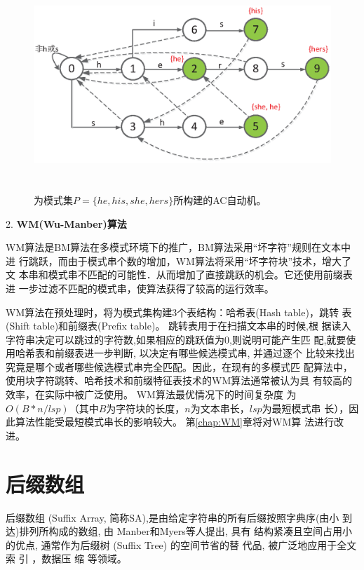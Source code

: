 \begin{figure}[H]
  \centering
  \includegraphics[height=8cm ,width=12cm]{figures/1_Introduction/AC.eps}
  \caption{为模式集$P=\{he, his, she, hers\}$所构建的AC自动机。}
  \label{fig:AC}
\end{figure}

2. \textbf{WM(Wu-Manber)算法}

WM算法是BM算法在多模式环境下的推广，BM算法采用“坏字符”规则在文本中进
行跳跃，而由于模式串个数的增加，WM算法将采用“坏字符块”技术，增大了文
本串和模式串不匹配的可能性．从而增加了直接跳跃的机会。它还使用前缀表进
一步过滤不匹配的模式串，使算法获得了较高的运行效率。

WM算法在预处理时，将为模式集构建3个表结构：哈希表(Hash table)，跳转
表(Shift table)和前缀表(Prefix table)。 跳转表用于在扫描文本串的时候,根
据读入字符串决定可以跳过的字符数,如果相应的跳跃值为0,则说明可能产生匹
配,就要使用哈希表和前缀表进一步判断, 以决定有哪些候选模式串, 并通过逐个
比较来找出究竟是哪个或者哪些候选模式串完全匹配。因此，在现有的多模式匹
配算法中，使用块字符跳转、哈希技术和前缀特征表技术的WM算法通常被认为具
有较高的效率，在实际中被广泛使用。 WM算法最优情况下的时间复杂度
为$O(B*n/lsp)$（其中$B$为字符块的长度，$n$为文本串长，$lsp$为最短模式串
长），因此算法性能受最短模式串长的影响较大。 第\ref{chap:WM}章将对WM算
法进行改进。

\section{后缀数组}

后缀数组 (Suffix Array, 简称SA),是由给定字符串的所有后缀按照字典序(由小
到达)排列所构成的数组, 由 Manber和Myers等人提出\cite{Manber1993}, 具有
结构紧凑且空间占用小的优点, 通常作为后缀树 (Suffix Tree) 的空间节省的替
代品, 被广泛地应用于全文索
引 \cite{Strate2015,Fischer2017,Arroyuelo2014}，数据压
缩\cite{Louza2015,Chien2015,Pradhan2016,Brisaboa2015} 等领域。

